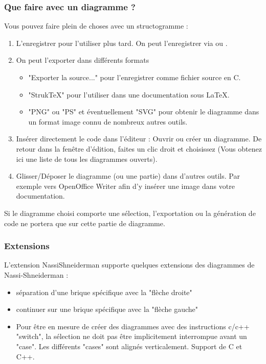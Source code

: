 \subsubsection{Que faire avec un diagramme ?}

Vous pouvez faire plein de choses avec un structogramme :

\begin{enumerate}
\item L'enregistrer pour l'utiliser plus tard. On peut l'enregistrer via  ou .
\item On peut l'exporter dans différents formats 
    \begin{itemize}
    \item "Exporter la source..." pour l'enregistrer comme fichier source en C.
    \item "StrukTeX" pour l'utiliser dans une documentation sous LaTeX.
    \item "PNG" ou "PS" et éventuellement "SVG" pour obtenir le diagramme dans un format image connu de nombreux autres outils.
    \end{itemize}        
\item Insérer directement le code dans l'éditeur : Ouvrir ou créer un diagramme. De retour dans la fenêtre d'édition, faites un clic droit et choisissez  (Vous obtenez ici une liste de tous les diagrammes ouverts).
\item Glisser/Déposer le diagramme (ou une partie) dans d'autres outils. Par exemple vers OpenOffice Writer afin d'y insérer une image dans votre documentation.
\end{enumerate}

Si le diagramme choisi comporte une sélection, l'exportation ou la génération de code ne portera que sur cette partie de diagramme. 

\subsubsection{Extensions}

L'extension NassiShneiderman supporte quelques extensions des diagrammes de Nassi-Shneiderman : 

\begin{itemize}
\item séparation d'une brique spécifique avec la "flèche droite"
\item continuer sur une brique spécifique avec la "flèche gauche"
\item Pour être en mesure de créer des diagrammes avec des instructions c/c++ "switch", la sélection ne doit pas être implicitement interrompue avant un "case". Les différents "cases" sont alignés verticalement. Support de C et C++.
\end{itemize}

